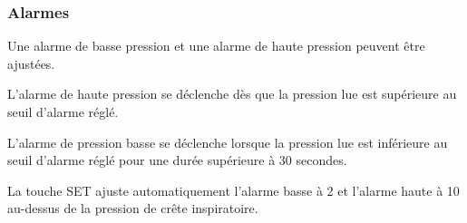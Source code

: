 \subsubsection{Alarmes}

Une alarme de basse pression et une alarme de haute pression peuvent être ajustées.

L'alarme de haute pression se déclenche dès que la pression lue est supérieure
au seuil d’alarme réglé.

L'alarme de pression basse se déclenche lorsque la pression lue est inférieure
au seuil d’alarme réglé pour une durée supérieure à 30 secondes.

La touche SET ajuste automatiquement l'alarme basse à 2 \cmh et l'alarme haute
à 10 \cmh au-dessus de la pression de crête inspiratoire.

